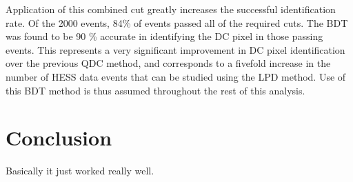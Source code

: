 \documentclass[]{article}
\begin{document}
Application of this combined cut greatly increases the successful identification rate. Of the 2000 events, 84\% of events passed all of the required cuts. The BDT was found to be 90 \% accurate in identifying the DC pixel in those passing events. This represents a very significant improvement in DC pixel identification over the previous QDC method, and corresponds to a fivefold increase in the number of HESS data events that can be studied using the LPD method. Use of this BDT method is thus assumed throughout the rest of this analysis.

\section{Conclusion}
Basically it just worked really well.



\end{document}
